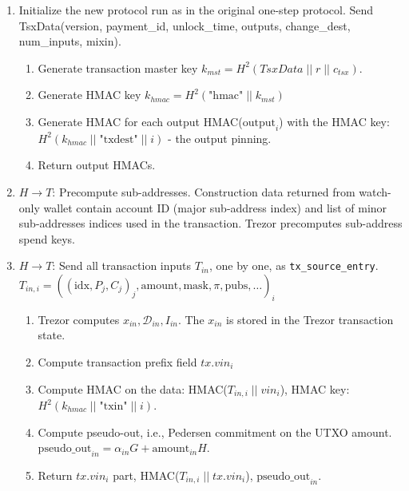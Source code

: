 \documentclass[]{article}
\begin{document}
\begin{enumerate}
	\item Initialize the new protocol run as in the original one-step protocol. Send TsxData(version, payment\_id, unlock\_time, outputs, change\_dest, num\_inputs, mixin).
	\begin{enumerate}
		\item Generate transaction master key $k_{mst} = H^2(TsxData \; || \; r \; || \; c_{tsx})$.
		
		\item Generate HMAC key $k_{hmac} = H^2\left(\text{"hmac"} \; || \; k_{mst}\right)$

		\item Generate HMAC for each output HMAC($\text{output}_i$) with the HMAC key: $H^2(k_{hmac} \; || \; \text{"txdest"} \; || \; i)$ - the output pinning.
		
		\item Return output HMACs.
	\end{enumerate}
	
	\item $H \rightarrow T$: Precompute sub-addresses. Construction data returned from watch-only wallet contain account ID (major sub-address index) and list of minor sub-addresses indices used in the transaction. Trezor precomputes sub-address spend keys.

	\item $H \rightarrow T$: Send all transaction inputs $T_{in}$, one by one, as \verb|tx_source_entry|.\\
	$T_{in,i} = ((\text{idx}, P_j,C_j)_j, \text{amount}, \text{mask}, \pi, \text{pubs}, \dots)_i$
	\begin{enumerate}
		\item Trezor computes $x_{in}, \mathcal{D}_{in}, I_{in}$. The $x_{in}$ is stored in the Trezor transaction state.
		
		\item Compute transaction prefix field $tx.vin_i$
		
		\item Compute HMAC on the data: HMAC($T_{in,i} \; || \; vin_i$), HMAC key: $H^2(k_{hmac} \; || \; \text{"txin"} \; || \; i)$.
		
		\item Compute pseudo-out, i.e., Pedersen commitment on the UTXO amount. $ \text{pseudo\_out}_{in} = \alpha_{in} G + \text{amount}_{in} H$.
		
		\item Return $tx.vin_i$ part, HMAC($T_{in,i} \; || \; tx.vin_i$), $\text{pseudo\_out}_{in}$.
	\end{enumerate} 


\end{enumerate}
\end{document}
